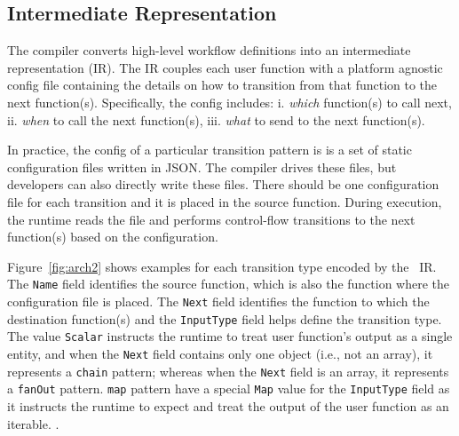 

\subsection{\name{} Intermediate Representation}
\label{sec:ir}

The \name{} compiler converts high-level workflow definitions into an intermediate representation (IR). The IR couples each user function with a platform agnostic \name{} config file containing the details on how to transition from that function to the next function(s). Specifically, the \name{} config includes: i. \textit{which} function(s) to call next, ii. \textit{when} to call the next function(s), iii. \textit{what} to send to the next function(s). 



In practice, the \name{} config of a particular transition pattern is  is a set of static configuration
files written in JSON. The compiler drives these files, but developers can also directly write these files. 
There should be one configuration file for each transition and it
is placed in the source function. During
execution, the \name{} runtime reads the file and performs control-flow
transitions to the next function(s) based on the configuration.


Figure~\ref{fig:arch2} shows examples for each transition type encoded
by the \name{}~IR. The \texttt{Name} field identifies the source function, which is also the function where the
configuration file is placed. The \texttt{Next} field identifies the function
to which the destination function(s) and the
\texttt{InputType} field helps define the transition type. The value
\texttt{Scalar} instructs the runtime to treat user function's output as a
single entity, and when the \texttt{Next} field contains only one object
(i.e., not an array), it represents a \texttt{chain} pattern; whereas when the
\texttt{Next} field is an array, it represents a \texttt{fanOut} pattern.
\texttt{map} pattern have a special \texttt{Map} value for the
\texttt{InputType} field as it instructs the runtime to expect and treat the
output of the user function as an iterable. .






